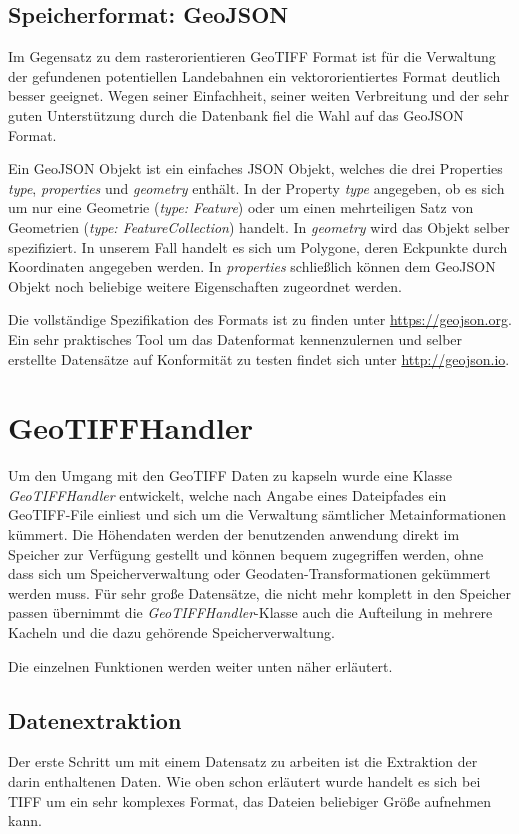 \documentclass[10pt,a4paper]{report}
\begin{document}
\subsection{Speicherformat: GeoJSON}
Im Gegensatz zu dem rasterorientieren GeoTIFF Format ist für die Verwaltung der gefundenen potentiellen Landebahnen ein vektororientiertes Format deutlich besser geeignet. Wegen seiner Einfachheit, seiner weiten Verbreitung und der sehr guten Unterstützung durch die Datenbank fiel die Wahl auf das GeoJSON Format.

Ein GeoJSON Objekt ist ein einfaches JSON Objekt, welches die drei Properties \emph{type}, \emph{properties} und \emph{geometry} enthält. In der Property \emph{type} angegeben, ob es sich um nur eine Geometrie (\emph{type: Feature}) oder um einen mehrteiligen Satz von Geometrien (\emph{type: FeatureCollection}) handelt. In \emph{geometry} wird das Objekt selber spezifiziert. In unserem Fall handelt es sich um Polygone, deren Eckpunkte durch Koordinaten angegeben werden. In \emph{properties} schließlich können dem GeoJSON Objekt noch beliebige weitere Eigenschaften zugeordnet werden.

Die vollständige Spezifikation des Formats ist zu finden unter \url{https://geojson.org}. Ein sehr praktisches Tool um das Datenformat kennenzulernen und selber erstellte Datensätze auf Konformität zu testen findet sich unter \url{http://geojson.io}.

\section{GeoTIFFHandler}

Um den Umgang mit den GeoTIFF Daten zu kapseln wurde eine Klasse \emph{GeoTIFFHandler} entwickelt, welche nach Angabe eines Dateipfades ein GeoTIFF-File einliest und sich um die Verwaltung sämtlicher Metainformationen kümmert. Die Höhendaten werden der benutzenden anwendung direkt im Speicher zur Verfügung gestellt und können bequem zugegriffen werden, ohne dass sich um Speicherverwaltung oder Geodaten-Transformationen gekümmert werden muss. Für sehr große Datensätze, die nicht mehr komplett in den Speicher passen übernimmt die \emph{GeoTIFFHandler}-Klasse auch die Aufteilung in mehrere Kacheln und die dazu gehörende Speicherverwaltung.

Die einzelnen Funktionen werden weiter unten näher erläutert.

\subsection{Datenextraktion}
Der erste Schritt um mit einem Datensatz zu arbeiten ist die Extraktion der darin enthaltenen Daten. Wie oben schon erläutert wurde handelt es sich bei TIFF um ein sehr komplexes Format, das Dateien beliebiger Größe aufnehmen kann.
\end{document}
